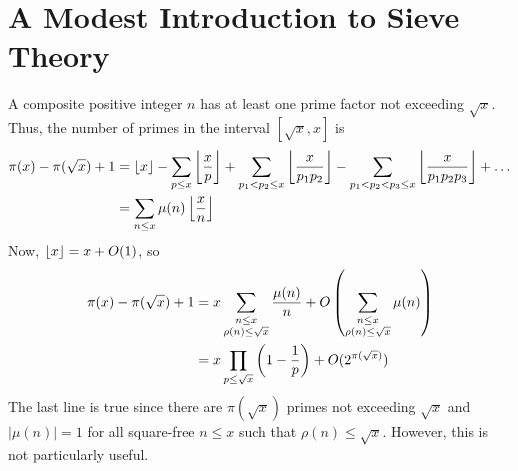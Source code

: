 \documentclass[elemannt.tex]{subfile}
\begin{document}
	\chapter[Sieve Theory]{A Modest Introduction to Sieve Theory}
	A composite positive integer $n$ has at least one prime factor not exceeding $\sqrt{x}$. Thus, the number of primes in the interval $[\sqrt{x},x]$ is
		\begin{align*}
			\pi(x)-\pi(\sqrt{x})+1
				& = \left\lfloor{x}\right\rfloor-\sum_{p\leq x}\left\lfloor{\dfrac{x}{p}}\right\rfloor+\sum_{p_{1}<p_{2}\leq x}\left\lfloor{\dfrac{x}{p_{1}p_{2}}}\right\rfloor-\sum_{p_{1}<p_{2}<p_{3}\leq x}\left\lfloor{\dfrac{x}{p_{1}p_{2}p_{3}}}\right\rfloor+\ldots\\
				& = \sum_{n\leq x}\mu(n)\left\lfloor{\dfrac{x}{n}}\right\rfloor
		\end{align*}
	Now, $\left\lfloor{x}\right\rfloor=x+O(1)$, so
		\begin{align*}
			\pi(x)-\pi(\sqrt{x})+1
				& = x\sum_{\substack{n\leq x\\\rho(n)\leq \sqrt{x}}}\dfrac{\mu(n)}{n}+O\left(\sum_{\substack{n\leq x\\\rho(n)\leq\sqrt{x}}}\mu(n)\right)\\
				& = x\prod_{p\leq\sqrt{x}}\left(1-\dfrac{1}{p}\right)+O(2^{\pi(\sqrt{x})})
		\end{align*}
	The last line is true since there are $\pi(\sqrt{x})$ primes not exceeding $\sqrt{x}$ and $|\mu(n)|=1$ for all square-free $n\leq x$ such that $\rho(n)\leq\sqrt{x}$. However, this is not particularly useful.
\end{document}
